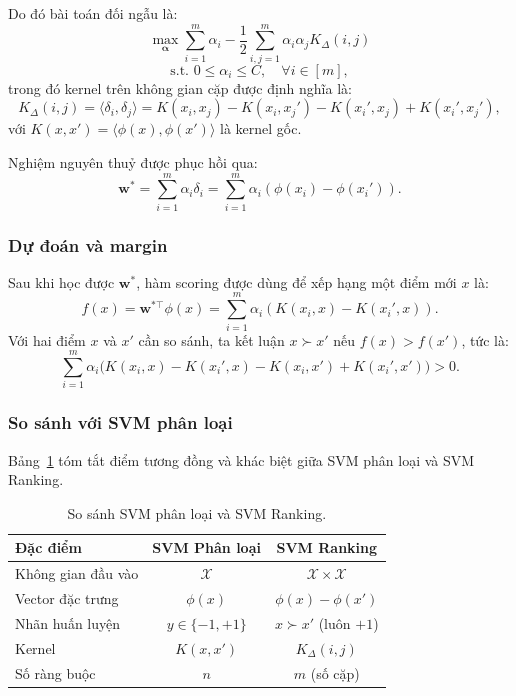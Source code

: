 Do đó bài toán đối ngẫu là:
\[
  \max_{\boldsymbol{\alpha}} 
  \sum_{i=1}^m \alpha_i 
  - \frac{1}{2} \sum_{i,j=1}^m \alpha_i \alpha_j 
    K_\Delta(i, j)
\]
\[
  \text{s.t. } 0 \leq \alpha_i \leq C, \quad \forall i \in [m],
\]
trong đó kernel trên không gian cặp được định nghĩa là:
\[
  K_\Delta(i,j) = \langle \delta_i, \delta_j \rangle 
  = K(x_i, x_j) - K(x_i, x_j') - K(x_i', x_j) + K(x_i', x_j'),
\]
với $K(x, x') = \langle \phi(x), \phi(x') \rangle$ là kernel gốc.

Nghiệm nguyên thuỷ được phục hồi qua:
\[
  \mathbf{w}^* = \sum_{i=1}^m \alpha_i \delta_i 
  = \sum_{i=1}^m \alpha_i (\phi(x_i) - \phi(x_i')).
\]

\subsubsection{Dự đoán và margin}

Sau khi học được $\mathbf{w}^*$, hàm scoring được dùng để xếp 
hạng một điểm mới $x$ là:
\[
  f(x) = \mathbf{w}^{*\top} \phi(x) 
  = \sum_{i=1}^m \alpha_i (K(x_i, x) - K(x_i', x)).
\]
Với hai điểm $x$ và $x'$ cần so sánh, ta kết luận $x \succ x'$ 
nếu $f(x) > f(x')$, tức là:
\[
  \sum_{i=1}^m \alpha_i 
  \big(K(x_i,x) - K(x_i',x) - K(x_i,x') + K(x_i',x')\big) > 0.
\]

\subsubsection{So sánh với SVM phân loại}

Bảng~\ref{tab:svm_compare} tóm tắt điểm tương đồng và khác biệt 
giữa SVM phân loại và SVM Ranking.

\begin{table}[h]
\centering
\begin{tabular}{lcc}
\hline
\textbf{Đặc điểm} & \textbf{SVM Phân loại} & \textbf{SVM Ranking} \\
\hline
Không gian đầu vào & $\mathcal{X}$ & $\mathcal{X} \times \mathcal{X}$ \\
Vector đặc trưng & $\phi(x)$ & $\phi(x) - \phi(x')$ \\
Nhãn huấn luyện & $y \in \{-1,+1\}$ & $x \succ x'$ (luôn $+1$) \\
Kernel & $K(x,x')$ & $K_\Delta(i,j)$ \\
Số ràng buộc & $n$ & $m$ (số cặp) \\
\hline
\end{tabular}
\caption{So sánh SVM phân loại và SVM Ranking.}
\label{tab:svm_compare}
\end{table}

